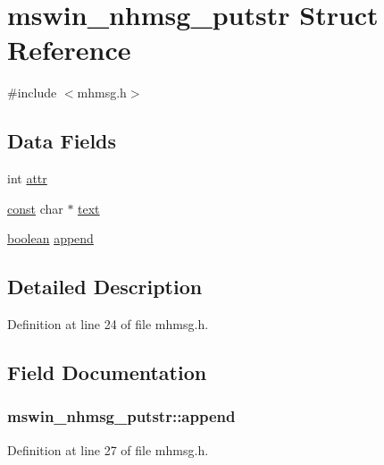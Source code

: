\hypertarget{structmswin__nhmsg__putstr}{\section{mswin\+\_\+nhmsg\+\_\+putstr Struct Reference}
\label{structmswin__nhmsg__putstr}
}


{\ttfamily \#include $<$mhmsg.\+h$>$}

\subsection*{Data Fields}
\begin{DoxyCompactItemize}
\item 
int \hyperlink{structmswin__nhmsg__putstr_aefa22819f8c3ca3574cfbcfd583ded58}{attr}
\item 
\hyperlink{tradstdc_8h_a2c212835823e3c54a8ab6d95c652660e}{const} char $\ast$ \hyperlink{structmswin__nhmsg__putstr_a27f09d7286c01fe17c1289761b63502e}{text}
\item 
\hyperlink{global_8h_a531b10dd351aa162d7dcccd1966308b8}{boolean} \hyperlink{structmswin__nhmsg__putstr_af1e2c11564b34538c13ee0ec5c9dda56}{append}
\end{DoxyCompactItemize}


\subsection{Detailed Description}


Definition at line 24 of file mhmsg.\+h.



\subsection{Field Documentation}
\hypertarget{structmswin__nhmsg__putstr_af1e2c11564b34538c13ee0ec5c9dda56}{
\subsubsection[{append}]{ mswin\+\_\+nhmsg\+\_\+putstr\+::append}}\label{structmswin__nhmsg__putstr_af1e2c11564b34538c13ee0ec5c9dda56}


Definition at line 27 of file mhmsg.\+h.



